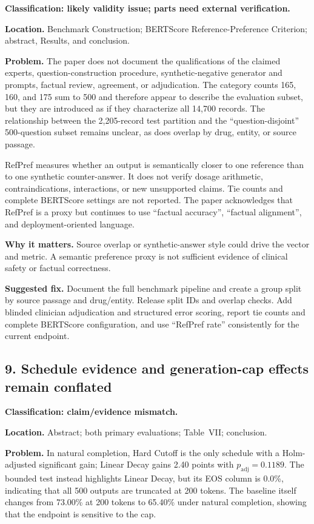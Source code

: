\documentclass[11pt]{article}
\begin{document}
\textbf{Classification: likely validity issue; parts need external verification.}

\textbf{Location.} Benchmark Construction; BERTScore Reference-Preference Criterion; abstract, Results, and conclusion.

\textbf{Problem.} The paper does not document the qualifications of the claimed experts, question-construction procedure, synthetic-negative generator and prompts, factual review, agreement, or adjudication.  The category counts 165, 160, and 175 sum to 500 and therefore appear to describe the evaluation subset, but they are introduced as if they characterize all 14,700 records.  The relationship between the 2,205-record test partition and the ``question-disjoint'' 500-question subset remains unclear, as does overlap by drug, entity, or source passage.

RefPref measures whether an output is semantically closer to one reference than to one synthetic counter-answer.  It does not verify dosage arithmetic, contraindications, interactions, or new unsupported claims.  Tie counts and complete BERTScore settings are not reported.  The paper acknowledges that RefPref is a proxy but continues to use ``factual accuracy'', ``factual alignment'', and deployment-oriented language.

\textbf{Why it matters.} Source overlap or synthetic-answer style could drive the vector and metric.  A semantic preference proxy is not sufficient evidence of clinical safety or factual correctness.

\textbf{Suggested fix.} Document the full benchmark pipeline and create a group split by source passage and drug/entity.  Release split IDs and overlap checks.  Add blinded clinician adjudication and structured error scoring, report tie counts and complete BERTScore configuration, and use ``RefPref rate'' consistently for the current endpoint.

\subsection*{9. Schedule evidence and generation-cap effects remain conflated}

\textbf{Classification: claim/evidence mismatch.}

\textbf{Location.} Abstract; both primary evaluations; Table~VII; conclusion.

\textbf{Problem.} In natural completion, Hard Cutoff is the only schedule with a Holm-adjusted significant gain; Linear Decay gains 2.40 points with $p_{\text{adj}}=0.1189$.  The bounded test instead highlights Linear Decay, but its EOS column is 0.0\%, indicating that all 500 outputs are truncated at 200 tokens.  The baseline itself changes from 73.00\% at 200 tokens to 65.40\% under natural completion, showing that the endpoint is sensitive to the cap.
\end{document}
